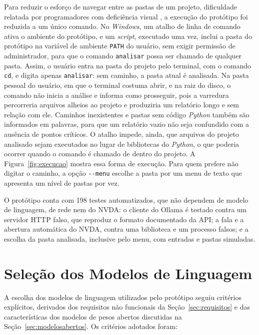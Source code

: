 \documentclass[
    12pt,                   %
    openright,              %
    oneside,                %
    a4paper,                %
    sumario=tradicional,    %
    english,                %
    brazil,                 %
    ]{abntex2}
\begin{document}
Para reduzir o esforço de navegar entre as pastas de um projeto, dificuldade relatada por programadores com deficiência visual \cite{latinoware20457}, a execução do protótipo foi reduzida a um único comando. No \textit{Windows}, um atalho de linha de comando ativa o ambiente do protótipo, e um \textit{script}, executado uma vez, inclui a pasta do protótipo na variável de ambiente \texttt{PATH} do usuário, sem exigir permissão de administrador, para que o comando \texttt{analisar} possa ser chamado de qualquer pasta. Assim, o usuário entra na pasta do projeto pelo terminal, com o comando \texttt{cd}, e digita apenas \texttt{analisar}: sem caminho, a pasta atual é analisada. Na pasta pessoal do usuário, em que o terminal costuma abrir, e na raiz do disco, o comando não inicia a análise e informa como prosseguir, pois a varredura percorreria arquivos alheios ao projeto e produziria um relatório longo e sem relação com ele. Caminhos inexistentes e pastas sem código \textit{Python} também são informados em palavras, para que um relatório vazio não seja confundido com a ausência de pontos críticos. O atalho impede, ainda, que arquivos do projeto analisado sejam executados no lugar de bibliotecas do \textit{Python}, o que poderia ocorrer quando o comando é chamado de dentro do projeto. A Figura~\ref{fig:execucao} mostra essa forma de execução. Para quem prefere não digitar o caminho, a opção \texttt{-{}-menu} escolhe a pasta por um menu de texto que apresenta um nível de pastas por vez.

O protótipo conta com 198 testes automatizados, que não dependem de modelo de linguagem, de rede nem do NVDA: o cliente do Ollama é testado contra um servidor HTTP falso, que reproduz o formato documentado da API; a fala e a abertura automática do NVDA, contra uma biblioteca e um processo falsos; e a escolha da pasta analisada, inclusive pelo menu, com entradas e pastas simuladas.

\section{Seleção dos Modelos de Linguagem}\label{sec:modelos}

A escolha dos modelos de linguagem utilizados pelo protótipo seguiu critérios explícitos, derivados dos requisitos não funcionais da Seção~\ref{sec:requisitos} e das características dos modelos de pesos abertos discutidas na Seção~\ref{sec:modelosabertos}. Os critérios adotados foram:
\end{document}
